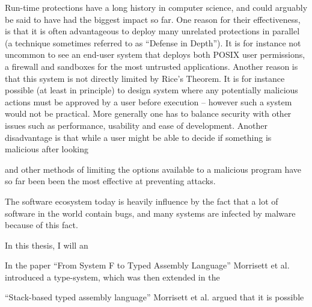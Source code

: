 Run-time protections have a long history in computer science, and could arguably
be said to have had the biggest impact so far. One reason for their
effectiveness, is that it is often advantageous to deploy many unrelated
protections in parallel (a technique sometimes referred to as ``Defense in
Depth''). It is for instance not uncommon to see an end-user system that deploys
both POSIX user permissions, a firewall and sandboxes for the most untrusted
applications. Another reason is that this system is not directly limited by
Rice's Theorem. It is for instance possible (at least in principle) to design
system where any potentially malicious actions must be approved by a user before
execution -- however such a system would not be practical. More generally one
has to balance security with other issues such as performance, usability and
ease of development. Another disadvantage is that while a user might be able to decide if something is malicious after looking


 and other methods of limiting the options available to a malicious
program have so far been  been the most effective at preventing attacks.

The software ecosystem today is heavily influence by the fact that a lot of
software in the world contain bugs, and many systems are infected by malware
because of this fact.

In this thesis, I will an

In the paper ``From System F to Typed Assembly Language'' Morrisett et
al.\cite{TAL} introduced a type-system, which was then extended in the

``Stack-based typed assembly language'' Morrisett et al. argued that it is possible
